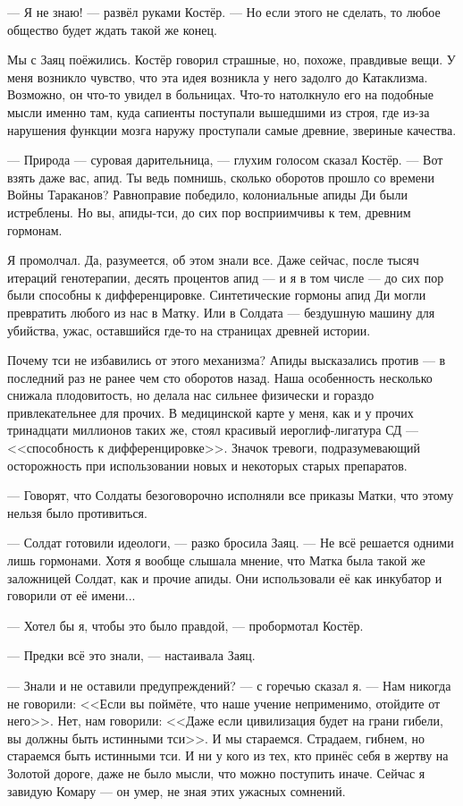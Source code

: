 --- Я не знаю! --- развёл руками Костёр.
--- Но если этого не сделать, то любое общество будет ждать такой же конец.

Мы с Заяц поёжились.
Костёр говорил страшные, но, похоже, правдивые вещи.
У меня возникло чувство, что эта идея возникла у него задолго до Катаклизма.
Возможно, он что-то увидел в больницах.
Что-то натолкнуло его на подобные мысли именно там, куда сапиенты поступали вышедшими из строя, где из-за нарушения функции мозга наружу проступали самые древние, звериные качества.

--- Природа --- суровая дарительница, --- глухим голосом сказал Костёр.
--- Вот взять даже вас, апид.
Ты ведь помнишь, сколько оборотов прошло со времени Войны Тараканов?
Равноправие победило, колониальные апиды Ди были истреблены.
Но вы, апиды-тси, до сих пор восприимчивы к тем, древним гормонам.

Я промолчал.
Да, разумеется, об этом знали все.
Даже сейчас, после тысяч итераций генотерапии, десять процентов апид --- и я в том числе --- до сих пор были способны к дифференцировке.
Синтетические гормоны апид Ди могли превратить любого из нас в Матку.
Или в Солдата --- бездушную машину для убийства, ужас, оставшийся где-то на страницах древней истории.

Почему тси не избавились от этого механизма?
Апиды высказались против --- в последний раз не ранее чем сто оборотов назад.
Наша особенность несколько снижала плодовитость, но делала нас сильнее физически и гораздо привлекательнее для прочих.
В медицинской карте у меня, как и у прочих тринадцати миллионов таких же, стоял красивый иероглиф-лигатура СД --- <<способность к дифференцировке>>.
Значок тревоги, подразумевающий осторожность при использовании новых и некоторых старых препаратов.

--- Говорят, что Солдаты безоговорочно исполняли все приказы Матки, что этому нельзя было противиться.

--- Солдат готовили идеологи, --- разко бросила Заяц.
--- Не всё решается одними лишь гормонами.
Хотя я вообще слышала мнение, что Матка была такой же заложницей Солдат, как и прочие апиды.
Они использовали её как инкубатор и говорили от её имени...

--- Хотел бы я, чтобы это было правдой, --- пробормотал Костёр.

--- Предки всё это знали, --- настаивала Заяц.

--- Знали и не оставили предупреждений? --- с горечью сказал я.
--- Нам никогда не говорили: <<Если вы поймёте, что наше учение неприменимо, отойдите от него>>.
Нет, нам говорили: <<Даже если цивилизация будет на грани гибели, вы должны быть истинными тси>>.
И мы стараемся.
Страдаем, гибнем, но стараемся быть истинными тси.
И ни у кого из тех, кто принёс себя в жертву на Золотой дороге, даже не было мысли, что можно поступить иначе.
Сейчас я завидую Комару --- он умер, не зная этих ужасных сомнений.

